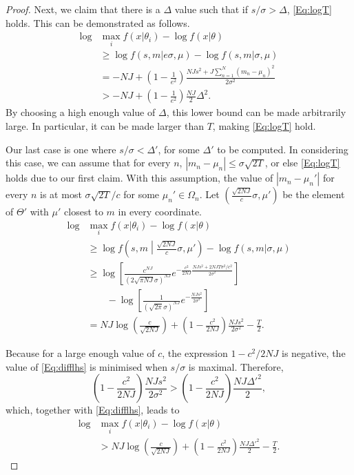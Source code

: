 \documentclass{IEEEtran}
\begin{document}
\begin{proof}
Next, we claim that there is a $\Delta$ value such that if
$s/\sigma>\Delta$, \eqref{Eq:logT}
holds. This can be demonstrated as follows.
\begin{align*}
\log & \max_i f(x|\theta_i) -\log f(x|\theta) \\
& \ge \log f(s,m|e\sigma,\mu) -\log f(s,m|\sigma,\mu) \\
&=-NJ+\left(1-\frac{1}{e^2}\right)\frac{NJs^2+J\sum_{n=1}^{N} (m_n-\mu_n)^2}{2\sigma^2} \\
&> -NJ + \left(1-\frac{1}{e^2}\right)\frac{NJ}{2}\Delta^2.
\end{align*}
By choosing a high enough value of $\Delta$, this lower bound can be made
arbitrarily large. In particular, it can be made larger than $T$, making
\eqref{Eq:logT} hold.

Our last case is one where $s/\sigma<\Delta'$, for some $\Delta'$ to be
computed. In considering this case, we can assume that for every $n$,
$|m_n-\mu_n|\le\sigma\sqrt{2T}$, or else \eqref{Eq:logT} holds due to our
first claim. With this assumption, the value of $|m_n-\mu_n'|$ for every $n$
is at most $\sigma\sqrt{2T}/c$ for some $\mu_n'\in \Omega_n$. Let
$(\frac{\sqrt{2NJ}}{c}\sigma,\mu')$ be the element of $\Theta'$ with $\mu'$
closest to $m$ in every coordinate.
\begin{align}
\log & \max_i f(x|\theta_i)-\log f(x|\theta) \nonumber\\
&\ge \log f\left(s,m\middle|\frac{\sqrt{2NJ}}{c}\sigma,\mu'\right)-\log f(s,m|\sigma,\mu) \nonumber\\
&\ge\log\left[\frac{c^{NJ}}{(2 \sqrt{\pi N J}\sigma)^{NJ}} e^{-\frac{c^2}{2 N J}\frac{NJs^2+2NJT\sigma^2/c^2}{2\sigma^2}}\right] \nonumber\\
&\quad\quad -\log\left[\frac{1}{(\sqrt{2\pi}\sigma)^{NJ}} e^{-\frac{NJs^2}{2\sigma^2}}\right] \nonumber\\
&=NJ\log\left(\frac{c}{\sqrt{2 N J}}\right) + \left(1-\frac{c^2}{2 N J}\right) \frac{NJs^2}{2\sigma^2} -\frac{T}{2}.\label{Eq:difflhs}
\end{align}

Because for a large enough value of $c$, the expression $1-c^2/2 N J$ is
negative, the value of \eqref{Eq:difflhs} is minimised when $s/\sigma$ is
maximal. Therefore,
\[
\left(1-\frac{c^2}{2 N J}\right) \frac{NJs^2}{2\sigma^2}
> \left(1-\frac{c^2}{2 N J}\right) \frac{NJ\Delta'^2}{2},
\]
which, together with \eqref{Eq:difflhs}, leads to
\begin{align*}
\log & \max_i f(x|\theta_i) -\log f(x|\theta) \\
&> NJ\log\left(\frac{c}{\sqrt{2 N J}}\right) + \left(1-\frac{c^2}{2 N J}\right) \frac{NJ\Delta'^2}{2} -\frac{T}{2}.
\end{align*}


\end{proof}
\end{document}
